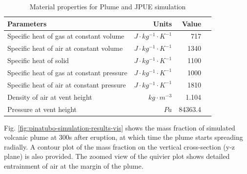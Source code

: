 \begin{table}[htp]
\centering
	\begin{centering}
      \caption{Material properties for Plume and JPUE simulation}		
	  \begin{tabular}{lrrr}
	    \hline
	    Parameters & Units  & Value \\
	    \hline
	    	Specific heat of gas at constant volume     & $J \cdot kg^{-1}\cdot K^{-1}$& 717     \\
	    Specific heat of air at constant volume     & $J \cdot kg^{-1}\cdot K^{-1}$& 1340    \\
	    	Specific heat of solid                      & $J \cdot kg^{-1}\cdot K^{-1}$& 1100    \\
	    	Specific heat of gas at constant pressure   & $J \cdot kg^{-1}\cdot K^{-1}$& 1000    \\
	    	Specific heat of air at constant pressure   & $J \cdot kg^{-1}\cdot K^{-1}$& 1810    \\
	    	Density of air at vent height               & $kg \cdot m^{-3}$       & 1.104   \\
	    Pressure at vent height                        & $Pa$              & 84363.4 \\
	    \hline
	  \end{tabular}
	  \label{tab:material_properties}
	\end{centering}
\end{table}

Fig. \ref{fig:pinatubo-simulation-results-vis} shows the mass fraction of simulated volcanic plume at 300s after eruption, at which time the plume starts spreading radially. A contour plot of the mass fraction on the vertical cross-section (y-z plane) is also provided. The zoomed view of the quivier plot shows detailed entrainment of air at the margin of the plume.

